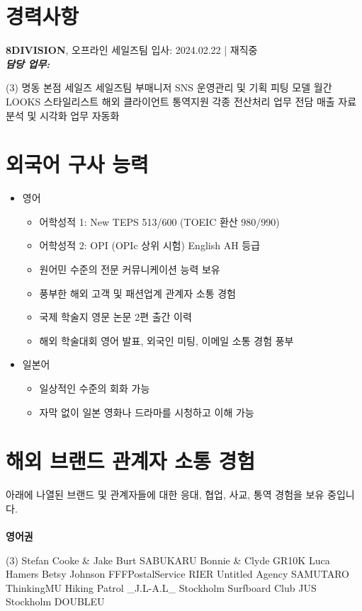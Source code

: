 \documentclass[a4paper,10pt]{extarticle}
\begin{document}
\section*{경력사항}
\noindent
{\large\textbf{8DIVISION}}, 오프라인 세일즈팀 \hfill 입사: 2024.02.22 | 재직중\\
{\textbf{\textit{담당 업무:}}}
\begin{tasks}[style=itemize](3)
    \task 명동 본점 세일즈
    \task 세일즈팀 부매니저
    \task SNS 운영관리 및 기획
    \task 피팅 모델
    \task 월간 LOOKS 스타일리스트
    \task 해외 클라이언트 통역지원
    \task 각종 전산처리 업무 전담
    \task 매출 자료 분석 및 시각화
    \task 업무 자동화
\end{tasks}

\section*{외국어 구사 능력}
\begin{itemize}
    \item 영어
          \begin{itemize}
              \item 어학성적 1: New TEPS 513/600 (TOEIC 환산 980/990)
              \item 어학성적 2: OPI (OPIc 상위 시험) English AH 등급
              \item 원어민 수준의 전문 커뮤니케이션 능력 보유
              \item 풍부한 해외 고객 및 패션업계 관계자 소통 경험
              \item 국제 학술지 영문 논문 2편 출간 이력
              \item 해외 학술대회 영어 발표, 외국인 미팅, 이메일 소통 경험 풍부
          \end{itemize}
    \item 일본어
          \begin{itemize}
              \item 일상적인 수준의 회화 가능
              \item 자막 없이 일본 영화나 드라마를 시청하고 이해 가능
          \end{itemize}
\end{itemize}

\section*{해외 브랜드 관계자 소통 경험}
아래에 나열된 브랜드 및 관계자들에 대한 응대, 협업, 사교, 통역 경험을 보유 중입니다.\\\\
\noindent
{\large\textbf{영어권}}
\begin{tasks}[style=itemize](3)
    \task Stefan Cooke \& Jake Burt
    \task SABUKARU
    \task Bonnie \& Clyde
    \task GR10K
    \task Luca Hamers
    \task Betsy Johnson
    \task FFFPostalService
    \task RIER
    \task Untitled Agency
    \task SAMUTARO
    \task ThinkingMU
    \task Hiking Patrol
    \task \_J.L-A.L\_
    \task Stockholm Surfboard Club
    \task JUS Stockholm
    \task DOUBLEU
\end{tasks}
\end{document}
